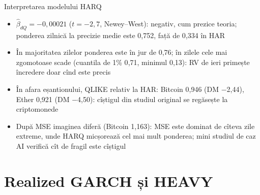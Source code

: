 \begin{frame}{Interpretarea modelului HARQ}
\itemsize{\small}
\begin{itemize}
    \item $\hat\beta_{dQ} = \ensuremath{-}0{,}00021$ ($t = \ensuremath{-}2{,}7$, Newey--West): negativ, cum prezice teoria; ponderea zilnică la precizie medie este 0{,}752, față de 0{,}334 în HAR
    \item În majoritatea zilelor ponderea este în jur de 0{,}76; în zilele cele mai zgomotoase scade (cuantila de 1\% 0{,}71, minimul 0{,}13): RV de ieri primește încredere doar cînd este precis
    \item În afara eșantionului, QLIKE relativ la HAR: Bitcoin 0{,}946 (DM \ensuremath{-}2{,}44), Ether 0{,}921 (DM \ensuremath{-}4{,}50): cîștigul din studiul original se regăsește la criptomonede
    \item După MSE imaginea diferă (Bitcoin 1{,}163): MSE este dominat de cîteva zile extreme, unde HARQ micșorează cel mai mult ponderea; mini studiul de caz AI verifică cît de fragil este cîștigul
\end{itemize}
\end{frame}


\section{Realized GARCH și HEAVY}


